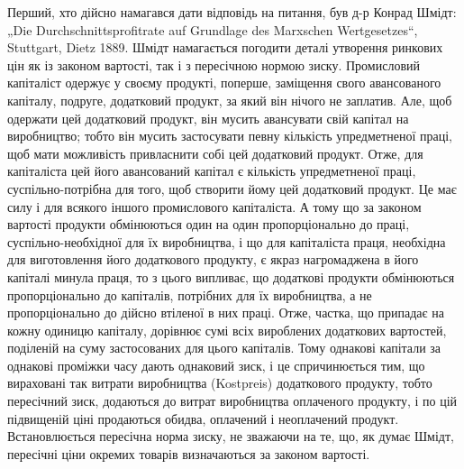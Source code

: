 Перший, хто дійсно намагався дати відповідь на питання, був
д-р Конрад Шмідт: „Die Durchschnittsprofitrate auf Grundlage des
Marxschen Wertgesetzes“, Stuttgart, Dietz 1889. Шмідт намагається
погодити деталі утворення ринкових цін як із законом
вартості, так і з пересічною нормою зиску. Промисловий капіталіст
одержує у своєму продукті, поперше, заміщення свого
авансованого капіталу, подруге, додатковий продукт, за який
він нічого не заплатив. Але, щоб одержати цей додатковий
продукт, він мусить авансувати свій капітал на виробництво;
тобто він мусить застосувати певну кількість упредметненої
праці, щоб мати можливість привласнити собі цей додатковий продукт.
Отже, для капіталіста цей його авансований капітал є кількість
упредметненої праці, суспільно-потрібна для того, щоб
створити йому цей додатковий продукт. Це має силу і для всякого
іншого промислового капіталіста. А тому що за законом
вартості продукти обмінюються один на один пропорціонально
до праці, суспільно-необхідної для їх виробництва, і що для капіталіста
праця, необхідна для виготовлення його додаткового продукту,
є якраз нагромаджена в його капіталі минула праця, то
з цього випливає, що додаткові продукти обмінюються пропорціонально
до капіталів, потрібних для їх виробництва, а не пропорціонально
до дійсно втіленої в них праці. Отже, частка, що
припадає на кожну одиницю капіталу, дорівнює сумі всіх вироблених
додаткових вартостей, поділеній на суму застосованих
для цього капіталів. Тому однакові капітали за однакові проміжки
часу дають однаковий зиск, і це спричинюється тим, що
вираховані так витрати виробництва (Kostpreis) додаткового
продукту, тобто пересічний зиск, додаються до витрат виробництва
оплаченого продукту, і по цій підвищеній ціні продаються
обидва, оплачений і неоплачений продукт. Встановлюється
пересічна норма зиску, не зважаючи на те, що, як
думає Шмідт, пересічні ціни окремих товарів визначаються за
законом вартості.


